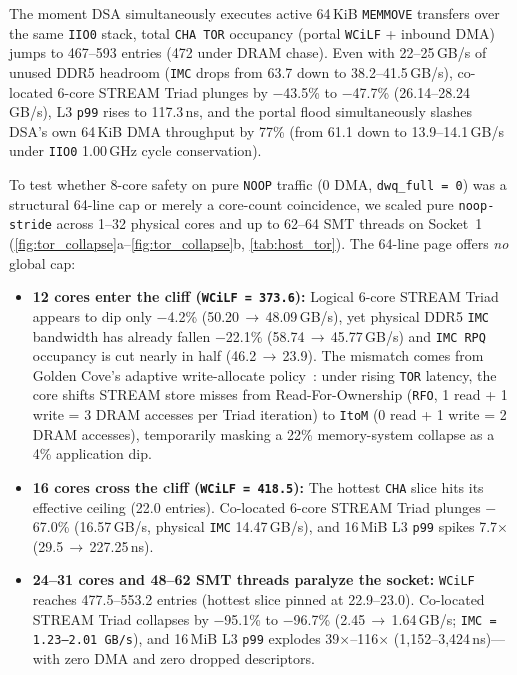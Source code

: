 The moment DSA simultaneously executes active 64\,KiB \texttt{MEMMOVE} transfers over the same \texttt{IIO0} stack, total \texttt{CHA TOR} occupancy (portal \texttt{WCiLF} + inbound DMA) jumps to 467--593 entries (472 under DRAM chase). Even with 22--25\,GB/s of unused DDR5 headroom (\texttt{IMC} drops from 63.7 down to 38.2--41.5\,GB/s), co-located 6-core STREAM Triad plunges by $-$43.5\% to $-$47.7\% (26.14--28.24\,GB/s), L3 \texttt{p99} rises to 117.3\,ns, and the portal flood simultaneously slashes DSA's own 64\,KiB DMA throughput by 77\% (from 61.1 down to 13.9--14.1\,GB/s under \texttt{IIO0} 1.00\,GHz cycle conservation).

To test whether 8-core safety on pure \texttt{NOOP} traffic (0 DMA, \texttt{dwq\_full\,=\,0}) was a structural 64-line cap or merely a core-count coincidence, we scaled pure \texttt{noop-stride} across 1--32 physical cores and up to 62--64 SMT threads on Socket~1 (\autoref{fig:tor_collapse}a--\ref{fig:tor_collapse}b, \autoref{tab:host_tor}). The 64-line page offers \emph{no} global cap:
\begin{itemize}
  \item \textbf{12 cores enter the cliff (\texttt{WCiLF\,=\,373.6}):} Logical 6-core STREAM Triad appears to dip only $-$4.2\% (50.20\,$\to$\,48.09\,GB/s), yet physical DDR5 \texttt{IMC} bandwidth has already fallen $-$22.1\% (58.74\,$\to$\,45.77\,GB/s) and \texttt{IMC RPQ} occupancy is cut nearly in half (46.2\,$\to$\,23.9). The mismatch comes from Golden Cove's adaptive write-allocate policy~\cite{mccalpin2023spr}: under rising \texttt{TOR} latency, the core shifts STREAM store misses from Read-For-Ownership (\texttt{RFO}, 1 read + 1 write = 3 DRAM accesses per Triad iteration) to \texttt{ItoM} (0 read + 1 write = 2 DRAM accesses), temporarily masking a 22\% memory-system collapse as a 4\% application dip.
  \item \textbf{16 cores cross the cliff (\texttt{WCiLF\,=\,418.5}):} The hottest \texttt{CHA} slice hits its effective ceiling (22.0 entries). Co-located 6-core STREAM Triad plunges $-$67.0\% (16.57\,GB/s, physical \texttt{IMC} 14.47\,GB/s), and 16\,MiB L3 \texttt{p99} spikes 7.7$\times$ (29.5\,$\to$\,227.25\,ns).
  \item \textbf{24--31 cores and 48--62 SMT threads paralyze the socket:} \texttt{WCiLF} reaches 477.5--553.2 entries (hottest slice pinned at 22.9--23.0). Co-located STREAM Triad collapses by $-$95.1\% to $-$96.7\% (2.45\,$\to$\,1.64\,GB/s; \texttt{IMC\,=\,1.23--2.01\,GB/s}), and 16\,MiB L3 \texttt{p99} explodes 39$\times$--116$\times$ (1,152--3,424\,ns)---with zero DMA and zero dropped descriptors.
\end{itemize}

